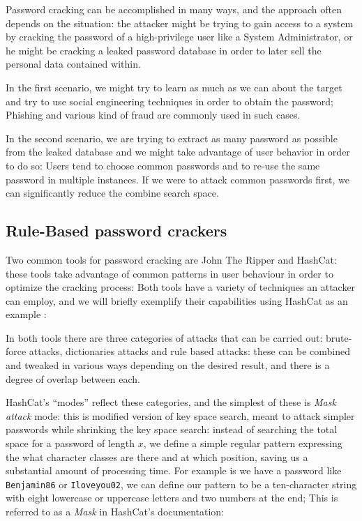 Password cracking can be accomplished in many ways, and the approach often depends on the situation: the attacker might be trying to gain access to a system by cracking the password of a high-privilege user like a System Administrator, or he might be cracking a leaked password database in order to later sell the personal data contained within.

In the first scenario, we might try to learn as much as we can about the target and try to use social engineering techniques in order to obtain the password; Phishing and various kind of fraud are commonly used in such cases. %

In the second scenario, we are trying to extract as many password as possible from the leaked database and we might take advantage of user behavior in order to do so: Users tend to choose common passwords and to re-use the same password in multiple instances.%
If we were to attack common passwords first, we can significantly reduce the combine search space.

\subsection{Rule-Based password crackers} \label{hash_and_jtr}

Two common tools for password cracking are John The Ripper and \break \mbox{HashCat}\cite{john,hash_cat}: these tools take advantage of common patterns in user behaviour in order to optimize the cracking process: Both tools have a variety of techniques an attacker can employ, and we will briefly exemplify their capabilities using HashCat as an example \cite{hash_cat_wiki}: \newline

In both tools there are three categories of attacks that can be carried out: brute-force attacks, dictionaries attacks and rule based attacks: these can be combined and tweaked in various ways depending on the desired result, and there is a degree of overlap between each.\newline 

HashCat's \enquote{modes} reflect these categories, and the simplest of these is \emph{Mask attack} mode: this is modified version of key space search, meant to attack simpler passwords while shrinking the key space search: 
instead of searching the total space for a password of length $x$, we define a simple regular pattern expressing the what character classes are there and at which position, saving us a substantial amount of processing time.
For example is we have a password like \texttt{Benjamin86} or \texttt{Iloveyou02}, we can define our pattern to be a ten-character string with eight lowercase or uppercase letters and two numbers at the end; This is referred to as a \emph{Mask} in HashCat's documentation:

